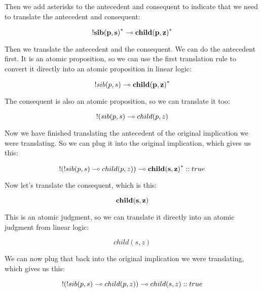 \documentclass[../../../main.tex]{subfiles}
\begin{document}
\noindent
Then we add asterisks to the antecedent and consequent to indicate that we need to translate the antecedent and consequent:

\begin{equation*}
  \bang/\nd{sib(p, s)}^{*} \lolli/ \nd{child(p, z)}^{*}
\end{equation*}

\noindent
Then we translate the antecedent and the consequent. We can do the antecedent first. It is an atomic proposition, so we can use the first translation rule to convert it directly into an atomic proposition in linear logic:

\begin{equation*}
  \bang/sib(p, s) \lolli/ \nd{child(p, z)}^{*}
\end{equation*}

\noindent
The consequent is also an atomic proposition, so we can translate it too:

\begin{equation*}
  \bang/(sib(p, s) \lolli/ child(p, z)
\end{equation*}

\noindent
Now we have finished translating the antecedent of the original implication we were translating. So we can plug it into the original implication, which gives us this:

\begin{equation*}
  \bang/(\bang/sib(p, s) \lolli/ child(p, z)) \lolli/ \nd{child(s, z)}^{*} :: true
\end{equation*}

\noindent
Now let's translate the consequent, which is this:

\begin{equation*}
  \mathbf{child(s, z)}
\end{equation*}

\noindent
This is an atomic judgment, so we can translate it directly into an atomic judgment from linear logic:

\begin{equation*}
  child(s, z)
\end{equation*}

\noindent
We can now plug that back into the original implication we were translating, which gives us this:

\begin{equation*}
  \bang/(\bang/sib(p, s) \lolli/ child(p, z)) \lolli/ child(s, z) :: true
\end{equation*}
\end{document}
